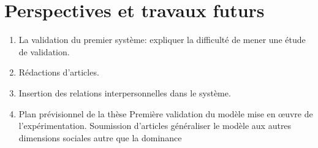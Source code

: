\documentclass[a4paper,french]{article}
\begin{document}
\section{Perspectives et travaux futurs}
\label{pers}
\begin{enumerate}
\item La validation du premier système: expliquer la difficulté de mener une étude de validation.
\item Rédactions d'articles.
\item Insertion des relations interpersonnelles dans le système.
\item Plan prévisionnel de la thèse
 \subitem Première validation du modèle
 	\subsubitem mise en œuvre de l’expérimentation.
 \subitem Soumission d'articles
 \subitem généraliser le modèle aux autres dimensions sociales autre que la dominance
\end{enumerate}
	\vskip 4pt
	
	{\footnotesize
			} %
	
\end{document}
